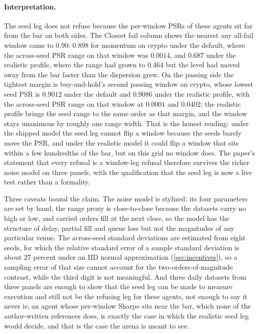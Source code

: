 \paragraph{Interpretation.} The seed leg does not refuse because the per-window PSRs of these agents sit far from the bar on both sides. The Closest fail column shows the nearest any all-fail window came to $0.90$: $0.898$ for momentum on crypto under the default, where the across-seed PSR range on that window was $0.0014$, and $0.687$ under the realistic profile, where the range had grown to $0.464$ but the level had moved away from the bar faster than the dispersion grew. On the passing side the tightest margin is buy-and-hold's second passing window on crypto, whose lowest seed PSR is $0.9012$ under the default and $0.9086$ under the realistic profile, with the across-seed PSR range on that window at $0.0001$ and $0.0402$; the realistic profile brings the seed range to the same order as that margin, and the window stays unanimous by roughly one range width. That is the honest reading: under the shipped model the seed leg cannot flip a window because the seeds barely move the PSR, and under the realistic model it could flip a window that sits within a few hundredths of the bar, but on this grid no window does. The paper's statement that every refusal is a window-leg refusal therefore survives the richer noise model on three panels, with the qualification that the seed leg is now a live test rather than a formality.

Three caveats bound the claim. The noise model is stylized: its four parameters are set by hand, the range proxy is close-to-close because the datasets carry no high or low, and carried orders fill at the next close, so the model has the structure of delay, partial fill and queue loss but not the magnitudes of any particular venue. The across-seed standard deviations are estimated from eight seeds, for which the relative standard error of a sample standard deviation is about $27$ percent under an IID normal approximation (\cref{sec:incentives}), so a sampling error of that size cannot account for the two-orders-of-magnitude contrast, while the third digit is not meaningful. And three daily datasets from three panels are enough to show that the seed leg can be made to measure execution and still not be the refusing leg for these agents, not enough to say it never is; an agent whose per-window Sharpe sits near the bar, which none of the author-written references does, is exactly the case in which the realistic seed leg would decide, and that is the case the arena is meant to see.
